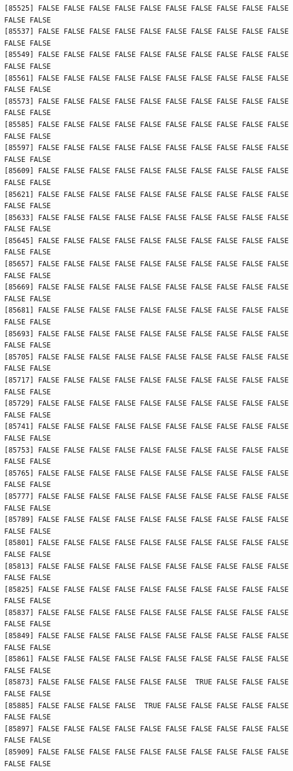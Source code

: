 \documentclass[
  a4paper,
  DIV=11,
  numbers=noendperiod]{scrartcl}
\begin{document}
\begin{verbatim}
[85525] FALSE FALSE FALSE FALSE FALSE FALSE FALSE FALSE FALSE FALSE FALSE FALSE
[85537] FALSE FALSE FALSE FALSE FALSE FALSE FALSE FALSE FALSE FALSE FALSE FALSE
[85549] FALSE FALSE FALSE FALSE FALSE FALSE FALSE FALSE FALSE FALSE FALSE FALSE
[85561] FALSE FALSE FALSE FALSE FALSE FALSE FALSE FALSE FALSE FALSE FALSE FALSE
[85573] FALSE FALSE FALSE FALSE FALSE FALSE FALSE FALSE FALSE FALSE FALSE FALSE
[85585] FALSE FALSE FALSE FALSE FALSE FALSE FALSE FALSE FALSE FALSE FALSE FALSE
[85597] FALSE FALSE FALSE FALSE FALSE FALSE FALSE FALSE FALSE FALSE FALSE FALSE
[85609] FALSE FALSE FALSE FALSE FALSE FALSE FALSE FALSE FALSE FALSE FALSE FALSE
[85621] FALSE FALSE FALSE FALSE FALSE FALSE FALSE FALSE FALSE FALSE FALSE FALSE
[85633] FALSE FALSE FALSE FALSE FALSE FALSE FALSE FALSE FALSE FALSE FALSE FALSE
[85645] FALSE FALSE FALSE FALSE FALSE FALSE FALSE FALSE FALSE FALSE FALSE FALSE
[85657] FALSE FALSE FALSE FALSE FALSE FALSE FALSE FALSE FALSE FALSE FALSE FALSE
[85669] FALSE FALSE FALSE FALSE FALSE FALSE FALSE FALSE FALSE FALSE FALSE FALSE
[85681] FALSE FALSE FALSE FALSE FALSE FALSE FALSE FALSE FALSE FALSE FALSE FALSE
[85693] FALSE FALSE FALSE FALSE FALSE FALSE FALSE FALSE FALSE FALSE FALSE FALSE
[85705] FALSE FALSE FALSE FALSE FALSE FALSE FALSE FALSE FALSE FALSE FALSE FALSE
[85717] FALSE FALSE FALSE FALSE FALSE FALSE FALSE FALSE FALSE FALSE FALSE FALSE
[85729] FALSE FALSE FALSE FALSE FALSE FALSE FALSE FALSE FALSE FALSE FALSE FALSE
[85741] FALSE FALSE FALSE FALSE FALSE FALSE FALSE FALSE FALSE FALSE FALSE FALSE
[85753] FALSE FALSE FALSE FALSE FALSE FALSE FALSE FALSE FALSE FALSE FALSE FALSE
[85765] FALSE FALSE FALSE FALSE FALSE FALSE FALSE FALSE FALSE FALSE FALSE FALSE
[85777] FALSE FALSE FALSE FALSE FALSE FALSE FALSE FALSE FALSE FALSE FALSE FALSE
[85789] FALSE FALSE FALSE FALSE FALSE FALSE FALSE FALSE FALSE FALSE FALSE FALSE
[85801] FALSE FALSE FALSE FALSE FALSE FALSE FALSE FALSE FALSE FALSE FALSE FALSE
[85813] FALSE FALSE FALSE FALSE FALSE FALSE FALSE FALSE FALSE FALSE FALSE FALSE
[85825] FALSE FALSE FALSE FALSE FALSE FALSE FALSE FALSE FALSE FALSE FALSE FALSE
[85837] FALSE FALSE FALSE FALSE FALSE FALSE FALSE FALSE FALSE FALSE FALSE FALSE
[85849] FALSE FALSE FALSE FALSE FALSE FALSE FALSE FALSE FALSE FALSE FALSE FALSE
[85861] FALSE FALSE FALSE FALSE FALSE FALSE FALSE FALSE FALSE FALSE FALSE FALSE
[85873] FALSE FALSE FALSE FALSE FALSE FALSE  TRUE FALSE FALSE FALSE FALSE FALSE
[85885] FALSE FALSE FALSE FALSE  TRUE FALSE FALSE FALSE FALSE FALSE FALSE FALSE
[85897] FALSE FALSE FALSE FALSE FALSE FALSE FALSE FALSE FALSE FALSE FALSE FALSE
[85909] FALSE FALSE FALSE FALSE FALSE FALSE FALSE FALSE FALSE FALSE FALSE FALSE

\end{verbatim}
\end{document}
